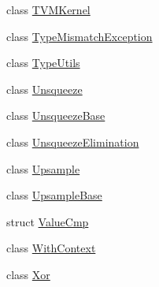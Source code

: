 \begin{DoxyCompactItemize}
class \mbox{\hyperlink{classonnxruntime_1_1TVMKernel}{T\+V\+M\+Kernel}}
\item 
class \mbox{\hyperlink{classonnxruntime_1_1TypeMismatchException}{Type\+Mismatch\+Exception}}
\item 
class \mbox{\hyperlink{classonnxruntime_1_1TypeUtils}{Type\+Utils}}
\item 
class \mbox{\hyperlink{classonnxruntime_1_1Unsqueeze}{Unsqueeze}}
\item 
class \mbox{\hyperlink{classonnxruntime_1_1UnsqueezeBase}{Unsqueeze\+Base}}
\item 
class \mbox{\hyperlink{classonnxruntime_1_1UnsqueezeElimination}{Unsqueeze\+Elimination}}
\item 
class \mbox{\hyperlink{classonnxruntime_1_1Upsample}{Upsample}}
\item 
class \mbox{\hyperlink{classonnxruntime_1_1UpsampleBase}{Upsample\+Base}}
\item 
struct \mbox{\hyperlink{structonnxruntime_1_1ValueCmp}{Value\+Cmp}}
\item 
class \mbox{\hyperlink{classonnxruntime_1_1WithContext}{With\+Context}}
\item 
class \mbox{\hyperlink{classonnxruntime_1_1Xor}{Xor}}
\end{DoxyCompactItemize}
